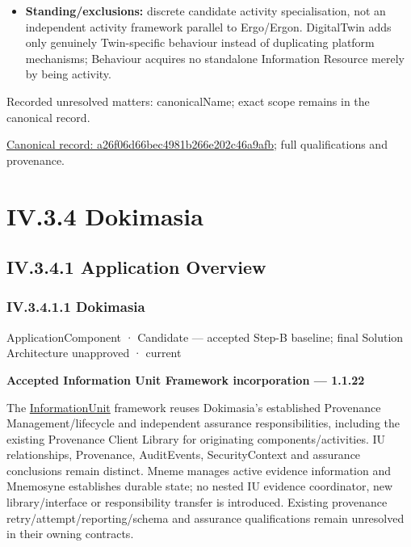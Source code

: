 \begin{itemize}
\item \textbf{Standing/exclusions:} discrete candidate activity specialisation, not an
  independent activity framework parallel to Ergo/Ergon. DigitalTwin adds only
  genuinely Twin-specific behaviour instead of duplicating platform mechanisms;
  Behaviour acquires no standalone Information Resource merely by being activity.

\end{itemize}

{\small Recorded unresolved matters: canonicalName; exact scope remains in the canonical record.}\par
{\footnotesize \href{../../../../../../../../continuum/application/application-component/a26f06d66bec4981b266e202c46a9afb.md}{Canonical record: a26f06d66bec4981b266e202c46a9afb}; full qualifications and provenance.}\par
\section*{IV.3.4 Dokimasia}
\label{navigation:IV.3.4}

\subsection*{IV.3.4.1 Application Overview}
\label{navigation:IV.3.4.1}

\subsubsection*{IV.3.4.1.1 Dokimasia}
\label{navigation:IV.3.4.1.1}

\label{element:d739c75dffe2453081735710b285f03b}
{\small ApplicationComponent · Candidate — accepted Step-B baseline; final Solution Architecture unapproved · current}\par

\par\medskip\textbf{Accepted Information Unit Framework incorporation — 1.1.22}\par


The \hyperref[element:74ec609de1ae498fbf9d13e4ef8c6cbe]{InformationUnit} framework reuses Dokimasia's established Provenance Management/lifecycle and independent assurance responsibilities, including the existing Provenance Client Library for originating components/activities. IU relationships, Provenance, AuditEvents, SecurityContext and assurance conclusions remain distinct. Mneme manages active evidence information and Mnemosyne establishes durable state; no nested IU evidence coordinator, new library/interface or responsibility transfer is introduced. Existing provenance retry/attempt/reporting/schema and assurance qualifications remain unresolved in their owning contracts.



